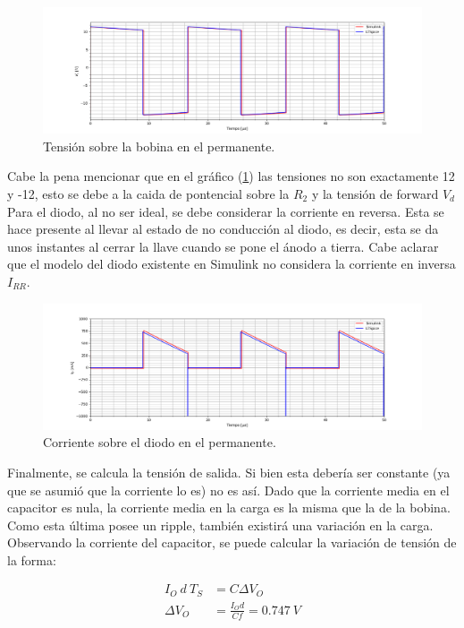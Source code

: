 \begin{figure}[H]
	\centering
	\includegraphics[width=0.9\linewidth]{ImagenesEjercicio-2/vl.png}
	\caption{Tensión sobre la bobina en el permanente.}
	\label{fig:ej2:vl}
\end{figure}
Cabe la pena mencionar que en el gráfico (\ref{fig:ej2:vl}) las tensiones no son exactamente 12 y -12, esto se debe a la caida de pontencial sobre la $R_{2}$ y la tensión de forward $V_d$\\
Para el diodo, al no ser ideal, se debe considerar la corriente en reversa. Esta se hace presente al llevar al estado de no conducción al diodo, es decir, esta se da unos instantes al cerrar la llave cuando se pone el ánodo a tierra. Cabe aclarar que el modelo del diodo existente en Simulink no considera la corriente en inversa $I_{RR}$.

\begin{figure}[H]
	\centering
	\includegraphics[width=0.9\linewidth]{ImagenesEjercicio-2/id.png}
	\caption{Corriente sobre el diodo en el permanente.}
	\label{fig:ej2:id}
\end{figure}

Finalmente, se calcula la tensión de salida. Si bien esta debería ser constante (ya que se asumió que la corriente lo es) no es así. Dado que la corriente media en el capacitor es nula, la corriente media en la carga es la misma que la de la bobina. Como esta última posee un ripple, también existirá una variación en la carga. Observando la corriente del capacitor, se puede calcular la variación de tensión de la forma:

\begin{align*}
I_O \ d \ T_S &= C \Delta V_O	\\
\Delta V_O &= \frac{I_O d}{C f} = 0.747 \ V
\end{align*}

